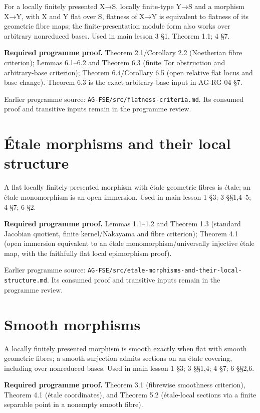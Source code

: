\documentclass[11pt,a4paper,openany]{report}
\newcounter{none}
\begin{document}
For a locally finitely presented X→S, locally finite-type Y→S and a morphism X→Y, with X and Y flat over S, flatness of X→Y is equivalent to flatness of its geometric fibre maps; the finite-presentation module form also works over arbitrary nonreduced bases. Used in main lesson 3 §1, Theorem 1.1; 4 §7.

\textbf{Required programme proof.} Theorem 2.1/Corollary 2.2 (Noetherian fibre criterion); Lemmas 6.1--6.2 and Theorem 6.3 (finite Tor obstruction and arbitrary-base criterion); Theorem 6.4/Corollary 6.5 (open relative flat locus and base change). Theorem 6.3 is the exact arbitrary-base input in AG-RG-04 §7.

Earlier programme source: \texttt{AG-FSE/src/flatness-criteria.md}. Its consumed proof and transitive inputs remain in the programme review.

\section{Étale morphisms and their local structure}\label{uxe9tale-morphisms-and-their-local-structure}

A flat locally finitely presented morphism with étale geometric fibres is étale; an étale monomorphism is an open immersion. Used in main lesson 1 §3; 3 §§1,4--5; 4 §7; 6 §2.

\textbf{Required programme proof.} Lemmas 1.1--1.2 and Theorem 1.3 (standard Jacobian quotient, finite kernel/Nakayama and fibre criterion); Theorem 4.1 (open immersion equivalent to an étale monomorphism/universally injective étale map, with the faithfully flat local epimorphism proof).

Earlier programme source: \texttt{AG-FSE/src/etale-morphisms-and-their-local-structure.md}. Its consumed proof and transitive inputs remain in the programme review.

\section{Smooth morphisms}\label{smooth-morphisms}

A locally finitely presented morphism is smooth exactly when flat with smooth geometric fibres; a smooth surjection admits sections on an étale covering, including over nonreduced bases. Used in main lesson 1 §3; 3 §§1,4; 4 §7; 6 §§2,6.

\textbf{Required programme proof.} Theorem 3.1 (fibrewise smoothness criterion), Theorem 4.1 (étale coordinates), and Theorem 5.2 (étale-local sections via a finite separable point in a nonempty smooth fibre).
\end{document}
